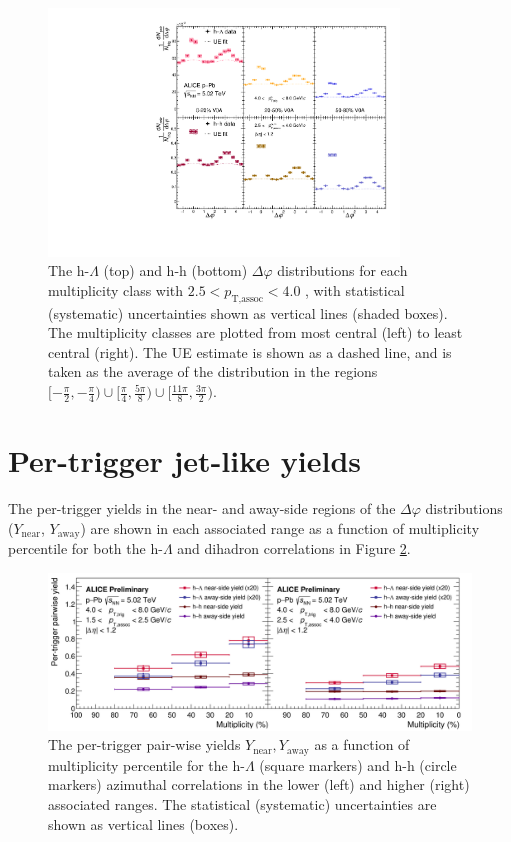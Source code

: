 \begin{figure}[h!]
\centering
\includegraphics[width=0.83\textwidth]{figures/results/dphi_final_highpt.pdf}
\caption{The h-$\Lambda$ (top) and h-h (bottom) $\Delta\varphi$ distributions for each multiplicity class with $2.5 < p_{\text{T,assoc}} < 4.0$ \GeVc, with statistical (systematic) uncertainties shown as vertical lines (shaded boxes). The multiplicity classes are plotted from most central (left) to least central (right). The UE estimate is shown as a dashed line, and is taken as the average of the distribution in the regions $[-\frac{\pi}{2}, -\frac{\pi}{4}) \cup [\frac{\pi}{4}, \frac{5\pi}{8}) \cup [\frac{11\pi}{8}, \frac{3\pi}{2})$.}
\label{fig:dphi_final_highpt}
\end{figure}

\clearpage

\section{Per-trigger jet-like yields}
\label{sec:jet_like_yields}

The per-trigger yields in the near- and away-side regions of the $\Delta\varphi$ distributions ($Y_{\text{near}}$, $Y_{\text{away}}$) are shown in each associated \pt range as a function of multiplicity percentile for both the h-$\Lambda$ and dihadron correlations in Figure \ref{fig:pairwise_yield}.

\begin{figure}[h!]
\centering
\includegraphics[width=\textwidth]{figures/results/pairwise_plot.png}
\caption{The per-trigger pair-wise yields $Y_{\text{near}}, Y_{\text{away}}$ as a function of multiplicity percentile for the h-$\Lambda$ (square markers) and h-h (circle markers) azimuthal correlations in the lower (left) and higher (right) associated \pt ranges. The statistical (systematic) uncertainties are shown as vertical lines (boxes).}
\label{fig:pairwise_yield}
\end{figure}

